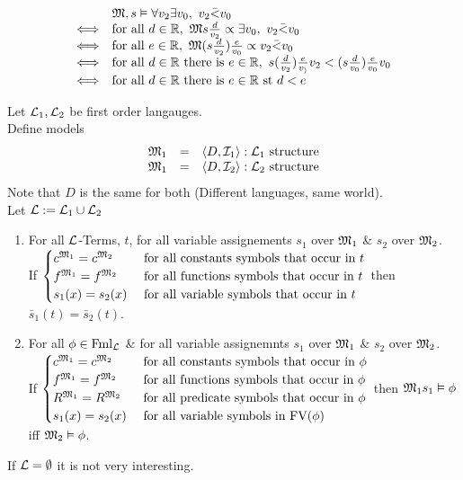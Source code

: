 \documentclass[11pt,a4paper]{article}
\begin{document}
\[\begin{array}{rl}
&\M,s\vDash\forall v_2\exists v_0,\ v_2\bar<v_0\\
\Longleftrightarrow&\text{for all }d\in\reals,\ \M s\frac{d}{v_2}\propto\exists v_0,\ v_2\bar<v_0\\
\Longleftrightarrow&\text{for all }e\in\reals,\ \M(s\frac{d}{v_2})\frac{e}{v_0}\propto v_2\bar<v_0\\
\Longleftrightarrow&\text{for all }d\in\reals\text{ there is }e\in\reals,\ s(\frac{d}{v_2})\frac{e}{v_)}v_2<(s\frac{d}{v_0})\frac{e}{v_0}v_0\\
\Longleftrightarrow&\text{for all }d\in\reals\text{ there is }e\in\reals\text{ st }d<e
\end{array}\]

\theorem{}
Let $\mathcal{L}_1,\mathcal{L}_2$ be first order langauges.\\
Define models
\[\begin{array}{rcl}
\mathfrak{M}_1&=&\langle D,\mathcal{I}_1\rangle:\mathcal{L}_1\text{ structure}\\
\mathfrak{M}_1&=&\langle D,\mathcal{I}_2\rangle:\mathcal{L}_2\text{ structure}
\end{array}\]
Note that $D$ is the same for both (\ie Different languages, same world).\\
Let $\mathcal{L}:=\mathcal{L}_1\cup\mathcal{L}_2$
\begin{enumerate}
	\item For all $\mathcal{L}$-Terms, $t$, for all variable assignements $s_1$ over $\mathfrak{M}_1$ \& $s_2$ over $\mathfrak{M}_2$.\\
	If $\begin{cases}c^{\mathfrak{M}_1}=c^{\mathfrak{M}_2}&\text{ for all constants symbols that occur in }t\\f^{\mathfrak{M}_1}=f^{\mathfrak{M}_2}&\text{ for all functions symbols that occur in }t\\s_1(x)=s_2(x)&\text{ for all variable symbols that occur in }t\end{cases}$ then $\bar{s}_1(t)=\bar{s}_2(t)$.
	\item For all $\phi\in\text{Fml}_{\mathcal{L}}$ \& for all variable assignemnts $s_1$ over $\mathfrak{M}_1$ \& $s_2$ over $\mathfrak{M}_2$.\\
	If $\begin{cases}c^{\mathfrak{M}_1}=c^{\mathfrak{M}_2}&\text{ for all constants symbols that occur in }\phi\\f^{\mathfrak{M}_1}=f^{\mathfrak{M}_2}&\text{ for all functions symbols that occur in }\phi\\R^{\mathfrak{M}_1}=R^{\mathfrak{M}_2}&\text{ for all predicate symbols that occur in }\phi\\s_1(x)=s_2(x)&\text{ for all variable symbols in FV}(\phi)\end{cases}$ then $\mathfrak{M}_1s_1\vDash\phi$ iff $\mathfrak{M}_2\vDash\phi$.\\
\end{enumerate}
\nb If $\mathcal{L}=\emptyset$ it is not very interesting.\\
\end{document}
